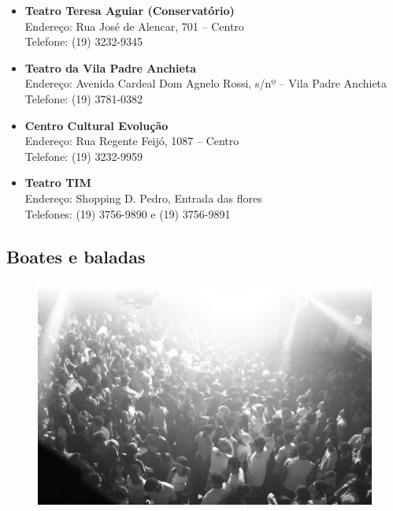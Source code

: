 \begin{itemize}
\item   \textbf{Teatro Teresa Aguiar (Conservatório)}
		\\Endereço: Rua José de Alencar, 701 -- Centro
		\\Telefone: (19) 3232-9345

\item   \textbf{Teatro da Vila Padre Anchieta}
		\\Endereço: Avenida Cardeal Dom Agnelo Rossi, s/nº -- Vila Padre Anchieta
		\\Telefone: (19) 3781-0382

\item   \textbf{Centro Cultural Evolução}
		\\Endereço: Rua Regente Feijó, 1087 -- Centro
		\\Telefone: (19) 3232-9959

\item   \textbf{Teatro TIM}
		\\Endereço: Shopping D. Pedro, Entrada das flores
		\\Telefones: (19) 3756-9890 e (19) 3756-9891

\end{itemize}

\subsection{Boates e baladas}

\begin{figure}[hb!]
    \centering
    \includegraphics[scale=0.15,keepaspectratio=true]{img/imgs/7-diversao/-053.jpg}
\end{figure}

